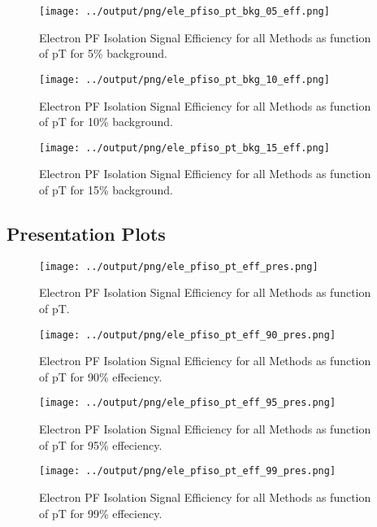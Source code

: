 \documentclass[11pt]{book}
\begin{document}
\begin{figure}[htb]
\centering
\texttt{[image: ../output/png/ele\_pfiso\_pt\_bkg\_05\_eff.png]}
\caption{Electron PF Isolation Signal Efficiency for all Methods as function of pT for 5\% background.}
\label{fig:ele_pfiso_pt_bkg_05_eff}
\end{figure}

\begin{figure}[htb]
\centering
\texttt{[image: ../output/png/ele\_pfiso\_pt\_bkg\_10\_eff.png]}
\caption{Electron PF Isolation Signal Efficiency for all Methods as function of pT for 10\% background.}
\label{fig:ele_pfiso_pt_bkg_10_eff}
\end{figure}

\begin{figure}[htb]
\centering
\texttt{[image: ../output/png/ele\_pfiso\_pt\_bkg\_15\_eff.png]}
\caption{Electron PF Isolation Signal Efficiency for all Methods as function of pT for 15\% background.}
\label{fig:ele_pfiso_pt_bkg_15_eff}
\end{figure}
\clearpage

\subsection{Presentation Plots}
\begin{figure}[htb]
\centering
\texttt{[image: ../output/png/ele\_pfiso\_pt\_eff\_pres.png]}
\caption{Electron PF Isolation Signal Efficiency for all Methods as function of pT.}
\label{fig:ele_pfiso_pt_eff_pres}
\end{figure}

\begin{figure}[htb]
\centering
\texttt{[image: ../output/png/ele\_pfiso\_pt\_eff\_90\_pres.png]}
\caption{Electron PF Isolation Signal Efficiency for all Methods as function of pT for 90\% effeciency.}
\label{fig:ele_pfiso_pt_eff_90_pres}
\end{figure}

\begin{figure}[htb]
\centering
\texttt{[image: ../output/png/ele\_pfiso\_pt\_eff\_95\_pres.png]}
\caption{Electron PF Isolation Signal Efficiency for all Methods as function of pT for 95\% effeciency.}
\label{fig:ele_pfiso_pt_eff_95_pres}
\end{figure}

\begin{figure}[htb]
\centering
\texttt{[image: ../output/png/ele\_pfiso\_pt\_eff\_99\_pres.png]}
\caption{Electron PF Isolation Signal Efficiency for all Methods as function of pT for 99\% effeciency.}
\label{fig:ele_pfiso_pt_eff_99_pres}
\end{figure}
\end{document}
